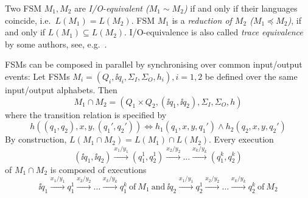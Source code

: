 Two FSM $M_1, M_2$ are \emph{I/O-equivalent ($M_1\sim M_2$)} if and only if their languages coincide, i.e.~$L(M_1) = L(M_2)$. FSM $M_1$ is a \emph{reduction of $M_2$ ($M_1 \preceq M_2$)},
if and only if $L(M_1) \subseteq L(M_2)$. I/O-equivalence is also called
\emph{trace equivalence} by some authors, see, e.g.~\cite{luo_test_1994}.



FSMs can be composed in parallel by synchronising over common input/output events:
Let FSMs $M_i=(Q_i, \ii{q_i}, \Sigma_I, \Sigma_O,  h_i), i = 1,2$ be defined over
the same input/output alphabets. Then
$$
M_1 \cap M_2 = (Q_1\times Q_2, (\ii{q_1},\ii{q_2}),\Sigma_I, \Sigma_O, h)
$$
where the transition relation is specified by
$$
h((q_1,q_2),x,y,(q_1',q_2')) \Leftrightarrow h_1(q_1,x,y,q_1') \wedge h_2(q_2,x,y,q_2')
$$
By construction, $L(M_1 \cap M_2) = L(M_1) \cap L(M_2)$. Every execution
$$
(\ii{q_1},\ii{q_2}) \xrightarrow{x_1/y_1} (q_1^1,q_2^1)
\xrightarrow{x_2/y_2} \dots \xrightarrow{x_k/y_k} (q_1^{k},q_2^{k})
$$
of
$M_1\cap M_2$
is composed of executions
$$
\ii{q_1} \xrightarrow{x_1/y_1} q_1^1
\xrightarrow{x_2/y_2} \dots \xrightarrow{x_k/y_k} q_1^{k}\
\text{of}\ M_1\ \text{and}\
\ii{q_2} \xrightarrow{x_1/y_1} q_2^1
\xrightarrow{x_2/y_2} \dots \xrightarrow{x_k/y_k} q_2^{k}\
\text{of}\ M_2
$$

